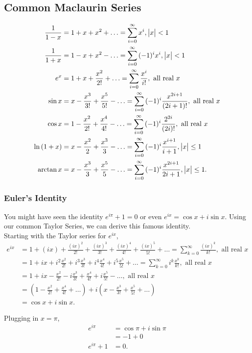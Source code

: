 \subsection{Common Maclaurin Series}
\begin{align*}
	\frac{1}{1-x} &= 1 + x + x^2 + \ldots = \sum_{i=0}^{\infty}{x^i}, \big\lvert x \big\rvert < 1 \\
	\frac{1}{1+x} &= 1 - x + x^2 - \ldots = \sum_{i=0}^{\infty}{(-1)^ix^i}, \big\lvert x \big\rvert < 1 \\
	e^x &= 1 + x + \frac{x^2}{2!} + \ldots = \sum_{i=0}^{\infty}{\frac{x^i}{i!}}, \text{ all real $x$} \\
	\sin{x} &= x - \frac{x^3}{3!} + \frac{x^5}{5!} - \ldots = \sum_{i=0}^{\infty}{(-1)^i\frac{x^{2i+1}}{(2i+1)!}}, \text{ all real $x$} \\
	\cos{x} &= 1 - \frac{x^2}{2!} + \frac{x^4}{4!} - \ldots = \sum_{i=0}^{\infty}{(-1)^i\frac{2^{2i}}{(2i)!}}, \text{ all real $x$} \\
	\ln{(1+x)} &= x - \frac{x^2}{2} + \frac{x^3}{3} - \ldots = \sum_{i=0}^{\infty}{(-1)^i\frac{x^{i+1}}{i+1}}, \big\lvert x \big\rvert \leq 1 \\
	\arctan{x} &= x - \frac{x^3}{3} + \frac{x^5}{5} - \ldots = \sum_{i=0}^{\infty}{(-1)^i\frac{x^{2i+1}}{2i+1}}, \big\lvert x \big\rvert \leq 1.
\end{align*}

\subsubsection{Euler's Identity}
You might have seen the identity $e^{i\pi} + 1 = 0$ or even $e^{ix} = \cos{x} + i\sin{x}$.
Using our common Taylor Series, we can derive this famous identity. \\


Starting with the Taylor series for $e^{ix}$,
\begin{align*}
	e^{ix} &= 1 + (ix) + \frac{(ix)^2}{2!} + \frac{(ix)^3}{3!} + \frac{(ix)^4}{4!} + \frac{(ix)^5}{5!} + \ldots = \sum_{k=0}^{\infty}{\frac{(ix)^k}{k!}}, \text{ all real $x$} \\
	&= 1 + ix + i^2\frac{x^2}{2!} + i^3\frac{x^3}{3!} + i^4\frac{x^4}{4!} + i^5\frac{x^5}{5!} + \ldots = \sum_{k=0}^{\infty}{i^k\frac{x^k}{k!}}, \text{ all real $x$} \\
	&= 1 + ix - \frac{x^2}{2!} - i\frac{x^3}{3!} + \frac{x^4}{4!} + i\frac{x^5}{5!} - \ldots, \text{ all real $x$} \\
	&= \left(1 - \frac{x^2}{2!} + \frac{x^4}{4!} + \ldots \right) + i\left(x - \frac{x^3}{3!} + \frac{x^5}{5!} + \ldots \right) \\
	&= \cos{x} + i\sin{x}.
\end{align*}

Plugging in $x=\pi$,
\begin{align*}
	e^{i\pi} &= \cos{\pi} + i\sin{\pi} \\
	&= -1 + 0 \\
	e^{i\pi} + 1 &= 0.
\end{align*}